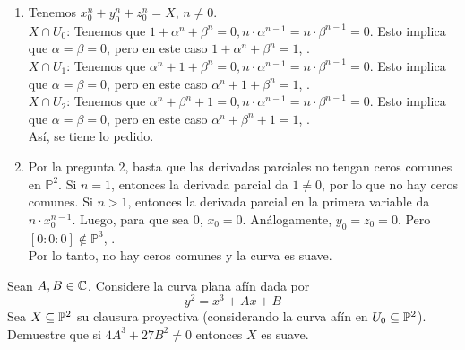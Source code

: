 \begin{sol}
	\begin{enumerate}
		\item Tenemos $x_0^n + y_0^n + z_0^n = X$, $n \not= 0$. \\
		      $X \cap U_0$: Tenemos que $1 + \alpha^n + \beta^n = 0, n \cdot \alpha^{n-1} = n \cdot \beta^{n-1} = 0$. Esto implica que $\alpha = \beta = 0$, pero en este caso $1 + \alpha^n + \beta^n = 1$, \nope. \\
		      $X \cap U_1$: Tenemos que $\alpha^n + 1 + \beta^n = 0, n \cdot \alpha^{n-1} = n \cdot \beta^{n-1} = 0$. Esto implica que $\alpha = \beta = 0$, pero en este caso $\alpha^n + 1 + \beta^n = 1$, \nope. \\
		      $X \cap U_2$: Tenemos que $\alpha^n + \beta^n + 1 = 0, n \cdot \alpha^{n-1} = n \cdot \beta^{n-1} = 0$. Esto implica que $\alpha = \beta = 0$, pero en este caso $\alpha^n + \beta^n + 1 = 1$, \nope. \\
		      Así, se tiene lo pedido.

		\item Por la pregunta 2, basta que las derivadas parciales no tengan ceros comunes en $\mathbb{P}^2$. Si $n = 1$, entonces la derivada parcial da $1 \not= 0$, por lo que no hay ceros comunes. Si $n > 1$, entonces la derivada parcial en la primera variable da $n \cdot x_0^{n-1}$. Luego, para que sea 0, $x_0 = 0$. Análogamente, $y_0 = z_0 = 0$. Pero $[0:0:0] \not\in \mathbb{P}^3$, \nope. \\
		      Por lo tanto, no hay ceros comunes y la curva es suave.
	\end{enumerate}
\end{sol}

\begin{prob}[4 pts.]
	Sean $A,B\in\mathbb{C}$. Considere la curva plana afín dada por
	\[y^2=x^3+Ax+B\]
	Sea $X\subseteq\mathbb{P}^2$ su clausura proyectiva (considerando la curva afín en $U_0\subseteq\mathbb{P}^2$). Demuestre que si $4A^3+27B^2\neq0$ entonces $X$ es suave.
\end{prob}

